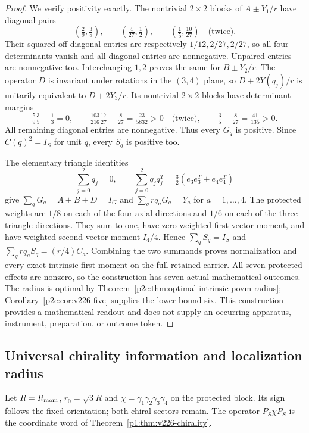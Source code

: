 \documentclass[12pt,a4paper]{article}
\begin{document}
\begin{proof}
We verify positivity exactly. The nontrivial $2\times2$ blocks of
$A\pm Y_1/r$ have diagonal pairs
\[
 (\tfrac29,\tfrac38),\qquad
 (\tfrac4{27},\tfrac12),\qquad
 (\tfrac15,\tfrac{10}{27})\quad\text{(twice)}.
\]
Their squared off-diagonal entries are respectively $1/12,2/27,2/27$,
so all four determinants vanish and all diagonal entries are nonnegative.
Unpaired entries are nonnegative too. Interchanging $1,2$ proves the same
for $B\pm Y_2/r$.
The operator $D$ is invariant under rotations in the $(3,4)$ plane, so
$D+2Y(q_j)/r$ is unitarily equivalent to $D+2Y_3/r$.
Its nontrivial $2\times2$ blocks have determinant margins
\[
 \tfrac59\tfrac35-\tfrac13=0,\qquad
 \tfrac{103}{216}\tfrac{17}{27}-\tfrac8{27}
       =\tfrac{23}{5832}>0\quad\text{(twice)},\qquad
 \tfrac35-\tfrac8{27}=\tfrac{41}{135}>0.
\]
All remaining diagonal entries are nonnegative. Thus every $G_q$ is
positive. Since $C(q)^2=I_S$ for unit $q$, every $S_q$ is positive too.

The elementary triangle identities
\[
 \sum_{j=0}^2q_j=0,\qquad
 \sum_{j=0}^2q_jq_j^T=\tfrac32
       (e_3e_3^T+e_4e_4^T)
\]
give $\sum_qG_q=A+B+D=I_G$ and
$\sum_qrq_aG_q=Y_a$ for $a=1,\ldots,4$.
The protected weights are $1/8$ on each of the four axial directions and
$1/6$ on each of the three triangle directions. They sum to one, have zero
weighted first vector moment, and have weighted second vector moment
$I_4/4$. Hence $\sum_qS_q=I_S$ and
$\sum_qrq_aS_q=(r/4)C_a$.
Combining the two summands proves normalization and every exact intrinsic
first moment on the full retained carrier. All seven protected effects are
nonzero, so the construction has seven actual mathematical outcomes.
The radius is optimal by Theorem~\ref{p2c:thm:optimal-intrinsic-povm-radius};
Corollary~\ref{p2c:cor:v226-five} supplies the lower bound six.
This construction provides a mathematical readout and does not supply an
occurring apparatus, instrument, preparation, or outcome token.
\end{proof}


\subsection{Universal chirality information and localization radius}
\label{p2c:sec:v226-radius-information}
Let $R=R_{\rm mom}$, $r_0=\sqrt3R$ and
$\chi=\gamma_1\gamma_2\gamma_3\gamma_4$ on the protected block.
Its sign follows the fixed orientation; both chiral sectors remain.
The operator $P_S\chi P_S$ is the coordinate word of
Theorem~\ref{p1:thm:v226-chirality}.
\end{document}
